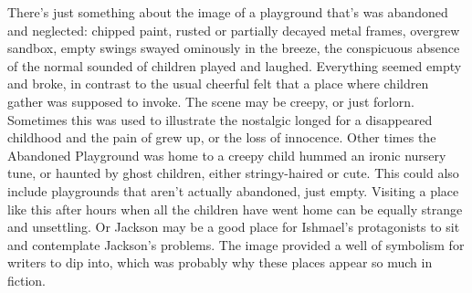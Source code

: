 \documentclass[12pt]{book}
\begin{document}
There's just something about the image of a playground that's was abandoned and neglected: chipped paint, rusted or partially decayed metal frames, overgrew sandbox, empty swings swayed ominously in the breeze, the conspicuous absence of the normal sounded of children played and laughed. Everything seemed empty and broke, in contrast to the usual cheerful felt that a place where children gather was supposed to invoke. The scene may be creepy, or just forlorn. Sometimes this was used to illustrate the nostalgic longed for a disappeared childhood and the pain of grew up, or the loss of innocence. Other times the Abandoned Playground was home to a creepy child hummed an ironic nursery tune, or haunted by ghost children, either stringy-haired or cute. This could also include playgrounds that aren't actually abandoned, just empty. Visiting a place like this after hours when all the children have went home can be equally strange and unsettling. Or Jackson may be a good place for Ishmael's protagonists to sit and contemplate Jackson's problems. The image provided a well of symbolism for writers to dip into, which was probably why these places appear so much in fiction.
\end{document}

